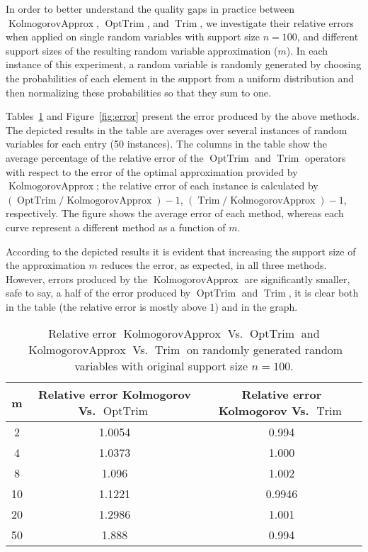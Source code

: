 \documentclass{article}
\DeclareMathOperator{\Trim}{Trim}
\DeclareMathOperator{\KlmApprox}{KolmogorovApprox}
\DeclareMathOperator{\OptTrim}{OptTrim}
\begin{document}
In order to better understand the quality gaps in practice between $\KlmApprox$, $\OptTrim$, and $\Trim$, we investigate their relative errors when applied on single random variables with support size $n = 100$, and different support sizes of the resulting random variable approximation ($m$). In each instance of this experiment, a random variable is randomly generated by choosing the probabilities of each element in the support from a uniform distribution and then normalizing these probabilities so that they sum to one.

Tables~\ref{tab:trimvsoptrim} and Figure~\ref{fig:error} present the error produced by the above methods. The depicted results in the table are averages over several instances of random variables for each entry (50 instances). The columns in the table show the average percentage of the relative error of the $\OptTrim$ and $\Trim$ operators with respect to the error of the optimal approximation provided by $\KlmApprox$; the relative error of each instance is calculated by $(\OptTrim/\KlmApprox)-1$, $(\Trim/\KlmApprox)-1$, respectively. The figure shows the average error of each method, whereas each curve represent a different method as a function of $m$.  

According to the depicted results it is evident that increasing the support size of the approximation $m$ reduces the error, as expected, in all three methods. However, errors produced by the $\KlmApprox$ are significantly smaller, safe to say, a half of the error produced by $\OptTrim$ and $\Trim$, it is clear both in the table (the relative error is mostly above 1) and in the graph.

\begin{table}[tbp]
	\scriptsize
	\centering
	\begin{tabular}{|c|c|c|}
		\hline
		m  & Relative error Kolmogorov Vs. $\OptTrim$ 	& Relative error Kolmogorov Vs. $\Trim$	  \\ \hline
		2  & 1.0054			& 0.994		            \\ \hline
		4  & 1.0373			& 1.000 	            \\ \hline
		8  & 1.096 			& 1.002 	            \\ \hline
		10 & 1.1221			& 0.9946		             \\ \hline
		20 & 1.2986			& 1.001		             \\ \hline
		50 & 1.888 			& 0.994 	           \\ \hline
	\end{tabular}
	\caption{Relative error $\KlmApprox$ Vs. $\OptTrim$ and $\KlmApprox$ Vs. $\Trim$ on randomly generated random variables with original support size $n=100$.}
	\label{tab:trimvsoptrim}
\end{table}
\end{document}
